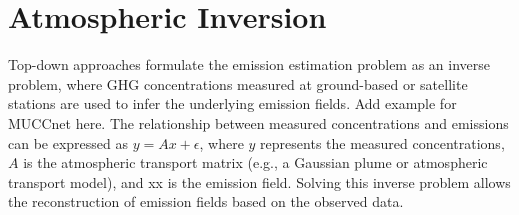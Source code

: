 



\section{Atmospheric Inversion}
Top-down approaches formulate the emission estimation problem as an inverse problem, where GHG concentrations measured at ground-based or satellite stations are used to infer the underlying emission fields.
Add example for MUCCnet here.
The relationship between measured concentrations and emissions can be expressed as $y= A x + \epsilon$, where $y$ represents the measured concentrations, $A$ is the atmospheric transport matrix (e.g., a Gaussian plume or atmospheric transport model), and xx is the emission field.
Solving this inverse problem allows the reconstruction of emission fields based on the observed data.

